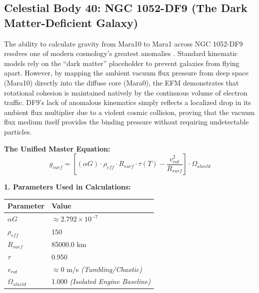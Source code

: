 \documentclass[11pt, a4paper]{article}
\begin{document}
\clearpage
\subsection{Celestial Body 40: NGC 1052-DF9 (The Dark Matter-Deficient Galaxy)}
  The ability to calculate gravity from Mara10 to Mara1 across NGC 1052-DF9 resolves one of modern cosmology's greatest anomalies \cite{vandokkum2019}. Standard kinematic models rely on the ``dark matter'' placeholder to prevent galaxies from flying apart. However, by mapping the ambient vacuum flux pressure from deep space (Mara10) directly into the diffuse core (Mara0), the EFM demonstrates that rotational cohesion is maintained natively by the continuous volume of electron traffic. DF9's lack of anomalous kinematics simply reflects a localized drop in its ambient flux multiplier due to a violent cosmic collision, proving that the vacuum flux medium itself provides the binding pressure without requiring undetectable particles.

  \vspace{0.5em}
  \noindent \textbf{The Unified Master Equation:}
  $$ g_{surf} = \left[ (\alpha G) \cdot \rho_{eff} \cdot R_{surf} \cdot \tau(T) - \frac{v_{rot}^2}{R_{surf}} \right] \cdot \Omega_{shield} $$

  \vspace{0.5em}
  \noindent \textbf{1. Parameters Used in Calculations:} \\[0.5em]
  \begingroup
  \renewcommand{\arraystretch}{1.3}
  \hspace*{2em}
  \begin{tabular}{|l|l|}
    \hline
    \textbf{Parameter} & \textbf{Value} \\ \hline
    $\alpha G$ & $\approx 2.792 \times 10^{-7}$ \\ \hline
    $\rho_{eff}$ & 150 \\ \hline
    $R_{surf}$ & 85000.0 km \\ \hline
    $\tau$ & 0.950 \\ \hline
    $v_{rot}$ & $\approx 0$ m/s \textit{(Tumbling/Chaotic)} \\ \hline
    $\Omega_{shield}$ & 1.000 \textit{(Isolated Engine Baseline)} \\ \hline
  \end{tabular}
  \endgroup
\end{document}
